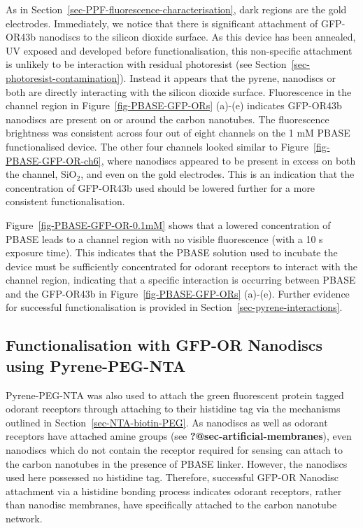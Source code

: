 \documentclass[
  a4paper,
]{scrbook}
\begin{document}
As in Section~\ref{sec-PPF-fluorescence-characterisation}, dark regions
are the gold electrodes. Immediately, we notice that there is
significant attachment of GFP-OR43b nanodiscs to the silicon dioxide
surface. As this device has been annealed, UV exposed and developed
before functionalisation, this non-specific attachment is unlikely to be
interaction with residual photoresist (see
Section~\ref{sec-photoresist-contamination}). Instead it appears that
the pyrene, nanodiscs or both are directly interacting with the silicon
dioxide surface. Fluorescence in the channel region in
Figure~\ref{fig-PBASE-GFP-ORs} (a)-(e) indicates GFP-OR43b nanodiscs are
present on or around the carbon nanotubes. The fluorescence brightness
was consistent across four out of eight channels on the 1 mM PBASE
functionalised device. The other four channels looked similar to
Figure~\ref{fig-PBASE-GFP-OR-ch6}, where nanodiscs appeared to be
present in excess on both the channel, SiO\(_2\), and even on the gold
electrodes. This is an indication that the concentration of GFP-OR43b
used should be lowered further for a more consistent functionalisation.

Figure~\ref{fig-PBASE-GFP-OR-0.1mM} shows that a lowered concentration
of PBASE leads to a channel region with no visible fluorescence (with a
10 s exposure time). This indicates that the PBASE solution used to
incubate the device must be sufficiently concentrated for odorant
receptors to interact with the channel region, indicating that a
specific interaction is occurring between PBASE and the GFP-OR43b in
Figure~\ref{fig-PBASE-GFP-ORs} (a)-(e). Further evidence for successful
functionalisation is provided in Section~\ref{sec-pyrene-interactions}.

\hypertarget{functionalisation-with-gfp-or-nanodiscs-using-pyrene-peg-nta}{%
\subsection{Functionalisation with GFP-OR Nanodiscs using
Pyrene-PEG-NTA}\label{functionalisation-with-gfp-or-nanodiscs-using-pyrene-peg-nta}}

Pyrene-PEG-NTA was also used to attach the green fluorescent protein
tagged odorant receptors through attaching to their histidine tag via
the mechanisms outlined in Section~\ref{sec-NTA-biotin-PEG}. As
nanodiscs as well as odorant receptors have attached amine groups (see
\textbf{?@sec-artificial-membranes}), even nanodiscs which do not
contain the receptor required for sensing can attach to the carbon
nanotubes in the presence of PBASE linker. However, the nanodiscs used
here possessed no histidine tag. Therefore, successful GFP-OR Nanodisc
attachment via a histidine bonding process indicates odorant receptors,
rather than nanodisc membranes, have specifically attached to the carbon
nanotube network.
\end{document}
